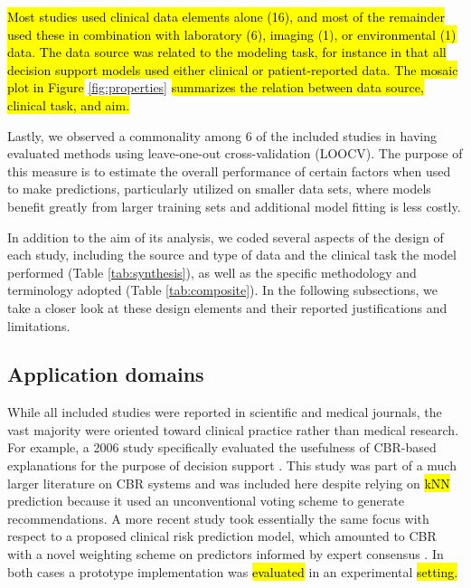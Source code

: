 \documentclass[sn-mathphys,Numbered,pdflatex]{sn-jnl}
\theoremstyle{remark}
\theoremstyle{definition}
\begin{document}
\hl{Most studies used clinical data elements alone
(16),
and most of the remainder used these in combination with laboratory
(6),
imaging
(1),
or environmental
(1)
data. The data source was related to the modeling task, for instance in that all decision support models used either clinical or patient-reported data.
The mosaic plot in Figure }\ref{fig:properties}\hl{ summarizes the relation between data source, clinical task, and aim.}

Lastly, we observed a commonality among 6 of the included studies in
having evaluated methods using leave-one-out cross-validation (LOOCV).
The purpose of this measure is to estimate the overall performance of
certain factors when used to make predictions, particularly utilized on
smaller data sets, where models benefit greatly from larger training
sets and additional model fitting is less costly.

In addition to the aim of its analysis, we coded several aspects of the
design of each study, including the source and type of data and the
clinical task the model performed (Table \ref{tab:synthesis}), as well
as the specific methodology and terminology adopted (Table
\ref{tab:composite}). In the following subsections, we take a closer
look at these design elements and their reported justifications and
limitations.

\subsection{Application domains}\label{application-domains}

While all included studies were reported in scientific and medical
journals, the vast majority were oriented toward clinical practice
rather than medical research. For example, a 2006 study specifically
evaluated the usefulness of CBR-based explanations for the purpose of
decision support \citep{Doyle2006}. This study was part of a much larger
literature on CBR systems and was included here despite relying on \hl{kNN}
prediction because it used an unconventional voting scheme to generate
recommendations. A more recent study took essentially the same focus
with respect to a proposed clinical risk prediction model, which
amounted to CBR with a novel weighting scheme on predictors informed by
expert consensus \citep{Fang2021}. In both cases a prototype
implementation was \hl{evaluated} in an experimental \hl{setting.}
\end{document}
